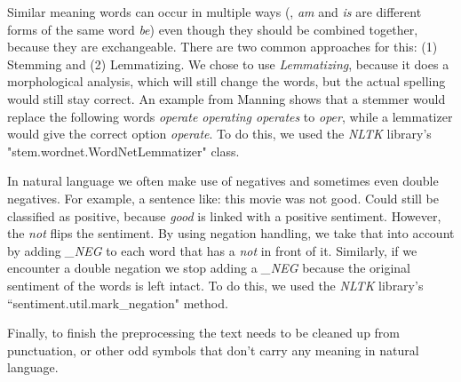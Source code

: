 Similar meaning words can occur in multiple ways (\eg, \textit{am} and \textit{is} are different forms of the same word \textit{be}) even though they should be combined together, because they are exchangeable.
There are two common approaches for this: (1) Stemming and (2) Lemmatizing. 
We chose to use \textit{Lemmatizing}, because it does a morphological analysis, which will still change the words, but the actual spelling would still stay correct.
An example from Manning \etal \cite{Manning:2008} shows that a stemmer would replace the following words \textit{operate operating operates} to \textit{oper}, while a lemmatizer would give the correct option \textit{operate}. To do this, we used the \textit{NLTK} library's "stem.wordnet.WordNetLemmatizer" class.

In natural language we often make use of negatives and sometimes even double negatives. For example, a sentence like: this movie was not good.
Could still be classified as positive, because \textit{good} is linked with a positive sentiment. However, the \textit{not} flips the sentiment.
By using negation handling, we take that into account by adding \textit{\_NEG} to each word that has a \textit{not} in front of it.
Similarly, if we encounter a double negation we stop adding a \textit{\_NEG} because the original sentiment of the words is left intact. To do this, we used the \textit{NLTK}\cite{Bird:2009} library's ``sentiment.util.mark\_negation" method.

Finally, to finish the preprocessing the text needs to be cleaned up from punctuation, or other odd symbols that don't carry any meaning in natural language.
